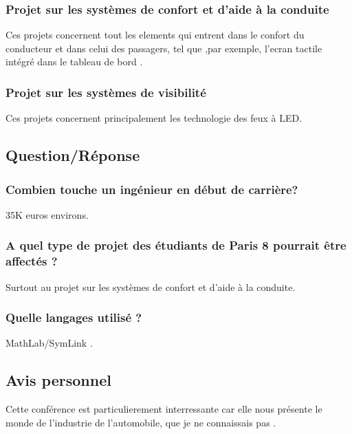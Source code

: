  		\subsubsection{Projet sur les systèmes de confort et d'aide à la conduite}
 		Ces projets concernent tout les elements qui entrent dans le confort du conducteur et dans celui des passagers, tel que ,par exemple, l'ecran tactile intégré dans le tableau de bord .
 		\subsubsection{Projet sur les systèmes de visibilité}
 		Ces projets concernent principalement les technologie des feux à LED.
 	\subsection{Question/Réponse}
 		\subsubsection{Combien touche un ingénieur en début de carrière?}
 		35K euros environs.
 		\subsubsection{A quel type de projet des étudiants de Paris 8 pourrait être affectés ?}
 		Surtout au projet sur les systèmes de confort et d'aide à la conduite.
 		\subsubsection{Quelle langages utilisé ?}
 		MathLab/SymLink .
 	\subsection{Avis personnel}
 	Cette conférence est particulierement interressante car elle nous présente le monde de l'industrie de l'automobile, que je ne connaissais pas . 